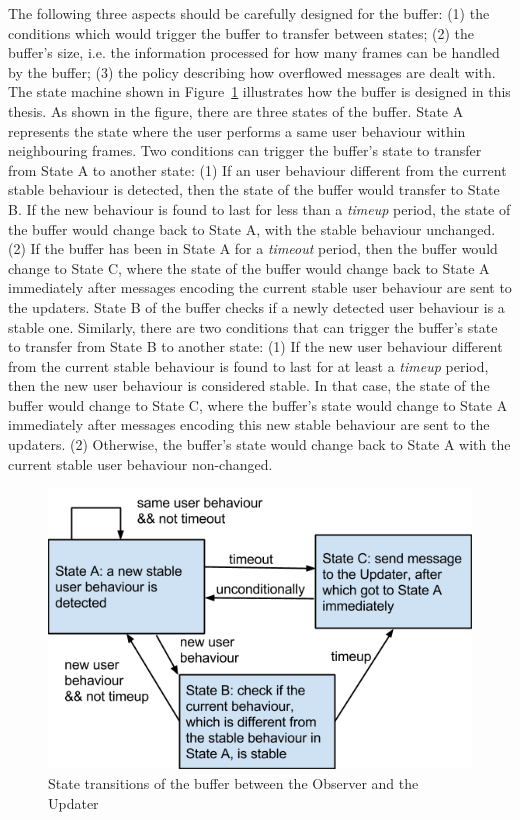The following three aspects should be carefully designed for the buffer: (1) the conditions which would trigger the buffer to transfer between states; (2) the buffer's size, i.e. the information processed for how many frames can be handled by the buffer; (3) the policy describing how overflowed messages are dealt with. The state machine shown in Figure~\ref{fig:state-trans} illustrates how the buffer is designed in this thesis. As shown in the figure, there are three states of the buffer. State A represents the state where the user performs a same user behaviour within neighbouring frames. Two conditions can trigger the buffer's state to transfer from State A to another state: (1) If an user behaviour different from the current stable behaviour is detected, then the state of the buffer would transfer to State B. If the new behaviour is found to last for less than a \textit{timeup} period, the state of the buffer would change back to State A, with the stable behaviour unchanged. (2) If the buffer has been in State A for a \textit{timeout} period, then the buffer would change to State C, where the state of the buffer would change back to State A immediately after messages encoding the current stable user behaviour are sent to the updaters. State B of the buffer checks if a newly detected user behaviour is a stable one. Similarly, there are two conditions that can trigger the buffer's state to transfer from State B to another state: (1) If the new user behaviour different from the current stable behaviour is found to last for at least a \textit{timeup} period, then the new user behaviour is considered stable. In that case, the state of the buffer would change to State C, where the buffer's state would change to State A immediately after messages encoding this new stable behaviour are sent to the updaters. (2) Otherwise, the buffer's state would change back to State A with the current stable user behaviour non-changed.

\begin{figure}[h!]
\centering
\includegraphics[width=0.7\linewidth]{fig/state-trans.png}
\caption{State transitions of the buffer between the Observer and the Updater}
\label{fig:state-trans}
\end{figure}

